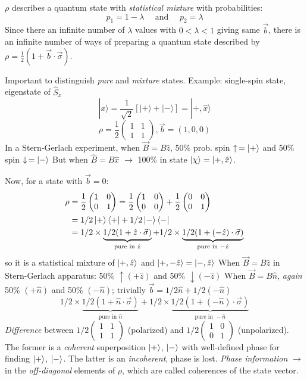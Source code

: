 \documentclass[12pt]{article}
\newcommand{\be}{\begin{equation}}
\newcommand{\ee}{\end{equation}}
\begin{document}
$\rho$ describes a quantum state with \emph{statistical
mixture} with probabilities:
\be
p_{1}=1-\lambda \quad \text { and } \quad p_{2}=\lambda
\ee
Since there an infinite number of $\lambda$ values with
$0<\lambda<1$ giving same $\vec{b}$, there is an infinite
number of ways of preparing a quantum
state described by $\rho=\frac{1}{2}(1+\vec{b} \cdot \vec{\sigma})$.

Important to distinguish \emph{pure} and \emph{mixture} states.
Example: single-spin state, eigenstate of $\hat{S}_x$
\be
|x\rangle=\frac{1}{\sqrt{2}}[|+\rangle+|-\rangle]=|+, \hat{x}\rangle
\ee
\be
\rho=\frac{1}{2}
\begin{pmatrix}
1 & 1 \\ 1 & 1
\end{pmatrix}, \vec{b}=(1,0,0)
\ee
In a Stern-Gerlach experiment, when $\vec{B}=B\hat{z}$,
50\% prob. spin $\uparrow\,= \ket{+}$ and 50\% spin $\downarrow\,= \ket{-}$
But when $\hat{B} = B\hat{x}$ $\to$ 100\% in state $\ket{\chi} = \ket{+,\hat{x}}$.

Now, for a state with $\vec{b} = 0$:
\be
\begin{aligned}
\rho 
&= \frac{1}{2}
\begin{pmatrix}
1 & 0\\0 & 1
\end{pmatrix}
=
\frac{1}{2}
\begin{pmatrix}
1 & 0\\0 & 0
\end{pmatrix}+
\frac{1}{2}
\begin{pmatrix}
0 & 0\\0 & 1
\end{pmatrix}\\
&=1/2\ket{+}\bra{+} + 1/2\ket{-}\bra{-}\\
&=1/2\times
\underbrace{1/2(1+\hat{z} \cdot \vec{\sigma})}%
_{\text{pure in }\hat{z}} + 
1/2\times
\underbrace{1/2(1+(-\hat{z}) \cdot \vec{\sigma})}%
_{\text{pure in }-\hat{z}}
\end{aligned}
\ee
so it is a statistical mixture of $\ket{+,\hat{z}}$ and $\ket{+,-\hat{z}} = \ket{-,\hat{z}}$ 
When $\vec{B} = B\hat{z}$ in Stern-Gerlach apparatus:
50\% $\uparrow(+\hat{z})$ and 50\% $\downarrow(-\hat{z})$
When $\vec{B} = B\hat{n}$, \emph{again}
50\% $(+\hat{n})$ and 50\% $(-\hat{n})$;
trivially $\vec{b}=1 / 2 \hat{n}+1 / 2(-\hat{n})$
\be
1/2\times
\underbrace{1/2(1+\hat{n} \cdot \vec{\sigma})}%
_{\text{pure in }\hat{n}} + 
1/2\times
\underbrace{1/2(1+(-\hat{n}) \cdot \vec{\sigma})}%
_{\text{pure in }-\hat{n}}
\ee
\emph{Difference} between
$1/2
\begin{pmatrix}
1 & 1\\1 & 1
\end{pmatrix}
$ (polarized)
and 
$1/2
\begin{pmatrix}
1 & 0\\0 & 1
\end{pmatrix}
$ (unpolarized).
The former is a \emph{coherent} superposition $\ket{+}$, $\ket{-}$ with
well-defined phase for finding $\ket{+}$, $\ket{-}$.
The latter is an \emph{incoherent},
phase is lost.
\emph{Phase information} $\to$ in the \emph{off-diagonal} elements of $\rho$,
which are called coherences of the state vector.
\end{document}

